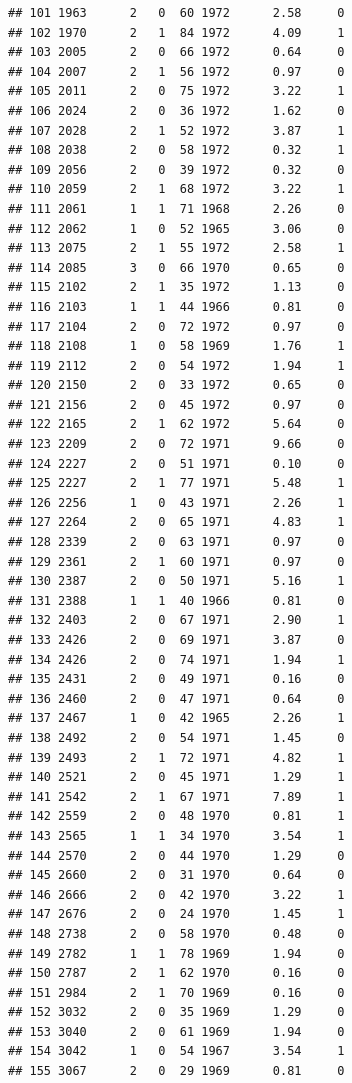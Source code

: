 \documentclass[
]{book}
\begin{document}
\begin{verbatim}
## 101 1963      2   0  60 1972      2.58     0
## 102 1970      2   1  84 1972      4.09     1
## 103 2005      2   0  66 1972      0.64     0
## 104 2007      2   1  56 1972      0.97     0
## 105 2011      2   0  75 1972      3.22     1
## 106 2024      2   0  36 1972      1.62     0
## 107 2028      2   1  52 1972      3.87     1
## 108 2038      2   0  58 1972      0.32     1
## 109 2056      2   0  39 1972      0.32     0
## 110 2059      2   1  68 1972      3.22     1
## 111 2061      1   1  71 1968      2.26     0
## 112 2062      1   0  52 1965      3.06     0
## 113 2075      2   1  55 1972      2.58     1
## 114 2085      3   0  66 1970      0.65     0
## 115 2102      2   1  35 1972      1.13     0
## 116 2103      1   1  44 1966      0.81     0
## 117 2104      2   0  72 1972      0.97     0
## 118 2108      1   0  58 1969      1.76     1
## 119 2112      2   0  54 1972      1.94     1
## 120 2150      2   0  33 1972      0.65     0
## 121 2156      2   0  45 1972      0.97     0
## 122 2165      2   1  62 1972      5.64     0
## 123 2209      2   0  72 1971      9.66     0
## 124 2227      2   0  51 1971      0.10     0
## 125 2227      2   1  77 1971      5.48     1
## 126 2256      1   0  43 1971      2.26     1
## 127 2264      2   0  65 1971      4.83     1
## 128 2339      2   0  63 1971      0.97     0
## 129 2361      2   1  60 1971      0.97     0
## 130 2387      2   0  50 1971      5.16     1
## 131 2388      1   1  40 1966      0.81     0
## 132 2403      2   0  67 1971      2.90     1
## 133 2426      2   0  69 1971      3.87     0
## 134 2426      2   0  74 1971      1.94     1
## 135 2431      2   0  49 1971      0.16     0
## 136 2460      2   0  47 1971      0.64     0
## 137 2467      1   0  42 1965      2.26     1
## 138 2492      2   0  54 1971      1.45     0
## 139 2493      2   1  72 1971      4.82     1
## 140 2521      2   0  45 1971      1.29     1
## 141 2542      2   1  67 1971      7.89     1
## 142 2559      2   0  48 1970      0.81     1
## 143 2565      1   1  34 1970      3.54     1
## 144 2570      2   0  44 1970      1.29     0
## 145 2660      2   0  31 1970      0.64     0
## 146 2666      2   0  42 1970      3.22     1
## 147 2676      2   0  24 1970      1.45     1
## 148 2738      2   0  58 1970      0.48     0
## 149 2782      1   1  78 1969      1.94     0
## 150 2787      2   1  62 1970      0.16     0
## 151 2984      2   1  70 1969      0.16     0
## 152 3032      2   0  35 1969      1.29     0
## 153 3040      2   0  61 1969      1.94     0
## 154 3042      1   0  54 1967      3.54     1
## 155 3067      2   0  29 1969      0.81     0

\end{verbatim}
\end{document}
